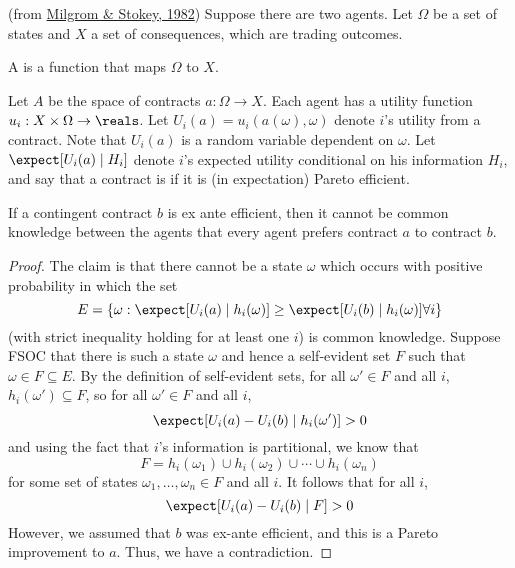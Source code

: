 \documentclass[10pt]{article}
\begin{document}
\begin{example}
	 (from \href{https://web.stanford.edu/~milgrom/publishedarticles/Information\%20Trade\%20and\%20Common\%20Knowledge.pdf}{Milgrom \& Stokey, 1982}) Suppose there are two agents. Let $\Omega$ be a set of states and $X$ a set of consequences, which are trading outcomes.
	
	\begin{definition}
		A  is a function that maps $\Omega$ to $X$.
	\end{definition}
	Let $A$ be the space of contracts $a: \Omega \to X$. Each agent has a utility function $u_i: X \times \Omega \to \reals$. Let $U_i(a) = u_i(a(\omega),\omega)$ denote $i$'s utility from a contract. Note that $U_i(a)$ is a random variable dependent on $\omega$. Let $\expect[U_i(a) \mid H_i]$ denote $i$'s expected utility conditional on his information $H_i$, and say that a contract is  if it is (in expectation) Pareto efficient.
\end{example}
\begin{theorem}
	If a contingent contract $b$ is ex ante efficient, then it cannot be common knowledge between the agents that every agent prefers contract $a$ to contract $b$.
\end{theorem}
\begin{proof}
	The claim is that there cannot be a state $\omega$ which occurs with positive probability in which the set\[E = \{\omega : \expect[U_i(a)\mid h_i(\omega)] \ge \expect[U_i(b) \mid h_i(\omega)] \forall i\}\](with strict inequality holding for at least one $i$) is common knowledge. Suppose FSOC that there is such a state $\omega$ and hence a self-evident set $F$ such that $\omega \in F \subseteq E$. By the definition of self-evident sets, for all $\omega'\in F$ and all $i$, $h_i(\omega') \subseteq F$, so for all $\omega'\in F$ and all $i$, \[\expect[U_i(a) - U_i(b) \mid h_i(\omega')] > 0\]and using the fact that $i$'s information is partitional, we know that \[F = h_i(\omega_1) \cup h_i(\omega_2) \cup \cdots \cup h_i(\omega_n)\]for some set of states $\omega_1,\dots,\omega_n \in F$ and all $i$. It follows that for all $i$, \[\expect[U_i(a) - U_i(b) \mid F] > 0\]However, we assumed that $b$ was ex-ante efficient, and this is a Pareto improvement to $a$. Thus, we have a contradiction. 
\end{proof}
\end{document}

